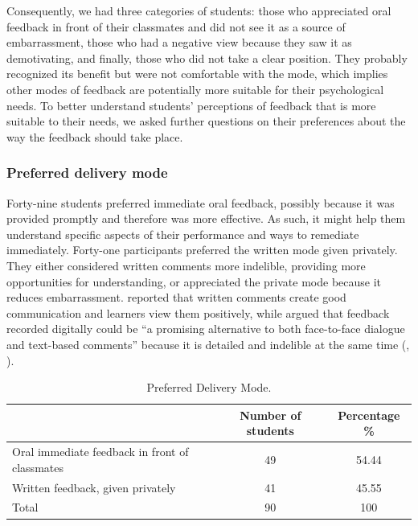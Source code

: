\documentclass[english]{textolivre}
\begin{document}
Consequently, we had three categories of students: those who appreciated oral feedback in front of their classmates and did not see it as a source of embarrassment, those who had a negative view because they saw it as demotivating, and finally, those who did not take a clear position. They probably recognized its benefit but were not comfortable with the mode, which implies other modes of feedback are potentially more suitable for their psychological needs. To better understand students’ perceptions of feedback that is more suitable to their needs, we asked further questions on their preferences about the way the feedback should take place.

\subsubsection{Preferred delivery mode}

Forty-nine students preferred immediate oral feedback, possibly because it was provided promptly and therefore was more effective. As such, it might help them understand specific aspects of their performance and ways to remediate immediately. Forty-one participants preferred the written mode given privately. They either considered written comments more indelible, providing more opportunities for understanding, or appreciated the private mode because it reduces embarrassment. \textcite[p. 165]{lee_feedback_2018} reported that written comments create good communication and learners view them positively, while \textcite[p. 1508]{ryan_feedback_2019} argued that feedback recorded digitally could be “a promising alternative to both face-to-face dialogue and text-based comments” because it is detailed and indelible at the same time (, ). 

\begin{table}[h!]
\centering
\begin{threeparttable}
\caption{Preferred Delivery Mode.}
\label{tbl16}
\begin{tabular}{p{} c c}
\toprule
 & Number of students & Percentage \% \\ \midrule
Oral immediate feedback in front of classmates & 49 & 54.44 \\
Written feedback, given privately & 41 & 45.55 \\
Total & 90 & 100 \\
\bottomrule
\end{tabular}
\end{threeparttable}
\end{table}
\end{document}
